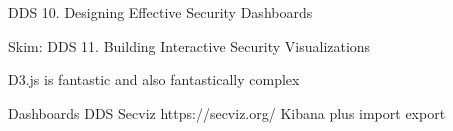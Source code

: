 \documentclass[Screen16to9,17pt]{foils}
\begin{document}
\begin{list1}
\item DDS 10. Designing Effective Security Dashboards
\begin{list2}
\item
\end{list2}
\end{list1}



\begin{quote}

\end{quote}

\begin{list1}
\item Skim: DDS 11. Building Interactive Security Visualizations
\begin{list2}
\item D3.js is fantastic and also fantastically complex
\end{list2}
\end{list1}





\begin{list1}
\item
\end{list1}


Dashboards DDS
Secviz https://secviz.org/
Kibana plus import export



\slidenext{}
\end{document}
